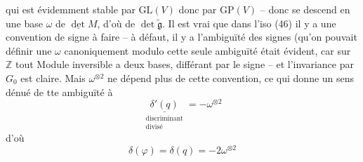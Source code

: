 qui est évidemment stable par $\mathrm{GL}(V)$ donc par $\mathrm{GP}(V)$ -- donc se descend en une base $\omega$ de $\underline{\det}M$, d'où de $\det\widetilde{\mathfrak g}$. Il est vrai que dans l'iso (46) il y a une convention de signe à faire -- à défaut, il y a l'ambiguïté des signes (qu'on pouvait définir une  $\omega$ canoniquement modulo cette seule ambiguïté était évident, car sur $\mathbb Z$ tout Module inversible a  deux bases, différant par le signe -- et l'invariance par  $G_0$ est claire. Mais $\omega^{\otimes2}$ ne dépend plus de cette convention, ce qui donne un sens dénué de tte ambiguïté à
\[
\underset{\substack{\text{discriminant}\\\text{divisé}}}{\underline{\delta'(q)}}=-\omega^{\otimes2}\tag*{(48)}
\]
d'où
\[
\delta(\varphi)=\delta(q)=-2\omega^{\otimes2}\tag*{(49)}
\]

